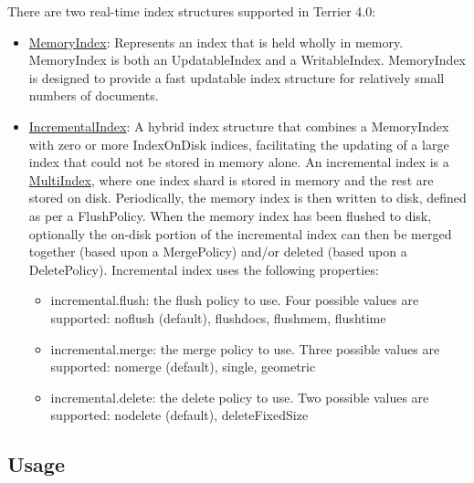 There are two real-time index structures supported in Terrier 4.0:

\begin{itemize}
\tightlist
\item
  \href{javadoc/org/terrier/realtime/memory/MemoryIndex.html}{MemoryIndex}:
  Represents an index that is held wholly in memory. MemoryIndex is both
  an UpdatableIndex and a WritableIndex. MemoryIndex is designed to
  provide a fast updatable index structure for relatively small numbers
  of documents.
\item
  \href{javadoc/org/terrier/realtime/incremental/IncrementalIndex.html}{IncrementalIndex}:
  A hybrid index structure that combines a MemoryIndex with zero or more
  IndexOnDisk indices, facilitating the updating of a large index that
  could not be stored in memory alone. An incremental index is a
  \href{javadoc/org/terrier/realtime/multi/MultiIndex.html}{MultiIndex},
  where one index shard is stored in memory and the rest are stored on
  disk. Periodically, the memory index is then written to disk, defined
  as per a FlushPolicy. When the memory index has been flushed to disk,
  optionally the on-disk portion of the incremental index can then be
  merged together (based upon a MergePolicy) and/or deleted (based upon
  a DeletePolicy). Incremental index uses the following properties:

  \begin{itemize}
  \tightlist
  \item
    incremental.flush: the flush policy to use. Four possible values are
    supported: noflush (default), flushdocs, flushmem, flushtime
  \end{itemize}

  \begin{itemize}
  \tightlist
  \item
    incremental.merge: the merge policy to use. Three possible values
    are supported: nomerge (default), single, geometric
  \end{itemize}

  \begin{itemize}
  \tightlist
  \item
    incremental.delete: the delete policy to use. Two possible values
    are supported: nodelete (default), deleteFixedSize
  \end{itemize}
\end{itemize}

\subsection{Usage}\label{usage}

